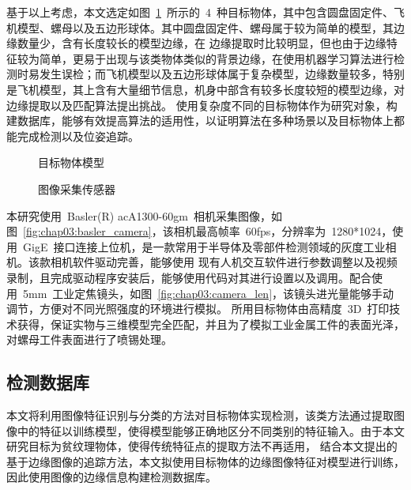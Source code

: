 基于以上考虑，本文选定如图~\ref{fig:chap03:object_model}~所示的~4~种目标物体，其中包含圆盘固定件、飞机模型、螺母以及五边形球体。其中圆盘固定件、螺母属于较为简单的模型，其边缘数量少，含有长度较长的模型边缘，在
边缘提取时比较明显，但也由于边缘特征较为简单，更易于出现与该类物体类似的背景边缘，在使用机器学习算法进行检测时易发生误检；而飞机模型以及五边形球体属于复杂模型，边缘数量较多，特别是飞机模型，其上含有大量细节信息，机身中部含有较多长度较短的模型边缘，对边缘提取以及匹配算法提出挑战。
使用复杂度不同的目标物体作为研究对象，构建数据库，能够有效提高算法的适用性，以证明算法在多种场景以及目标物体上都能完成检测以及位姿追踪。
\begin{figure}[t] %
  \centering%
  \caption{目标物体模型}
  \label{fig:chap03:object_model}
\end{figure}

\begin{figure}[t] %
\centering%
\caption{图像采集传感器}
\label{fig:chap03:camera_len_device}
\end{figure}

本研究使用~Basler(R) acA1300-60gm~相机采集图像，如图~\ref{fig:chap03:basler_camera}，该相机最高帧率~60fps，分辨率为~1280*1024，使用~GigE~接口连接上位机，是一款常用于半导体及零部件检测领域的灰度工业相机。该款相机软件驱动完善，能够使用
现有人机交互软件进行参数调整以及视频录制，且完成驱动程序安装后，能够使用代码对其进行设置以及调用。配合使用~5mm~工业定焦镜头，如图~\ref{fig:chap03:camera_len}，该镜头进光量能够手动调节，方便对不同光照强度的环境进行模拟。
所用目标物体由高精度~3D~打印技术获得，保证实物与三维模型完全匹配，并且为了模拟工业金属工件的表面光泽，对螺母工件表面进行了喷锡处理。
\subsection{检测数据库}
\label{sec:detect_dataset}
本文将利用图像特征识别与分类的方法对目标物体实现检测，该类方法通过提取图像中的特征以训练模型，使得模型能够正确地区分不同类别的特征输入。由于本文研究目标为贫纹理物体，使得传统特征点的提取方法不再适用，
结合本文提出的基于边缘图像的追踪方法，本文拟使用目标物体的边缘图像特征对模型进行训练，因此使用图像的边缘信息构建检测数据库。

